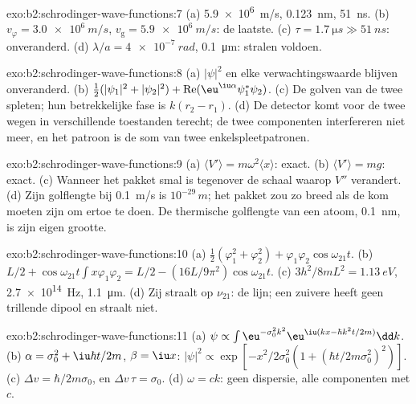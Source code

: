 \begin{solution}{exo:b2:schrodinger-wave-functions:7}
(a) \qty{5.9e6}{m/s}, \qty{0.123}{nm}, \qty{51}{ns}. (b)
$v_\varphi = \qty{3.0e6}{m/s}$,
$v_{\text{g}} = \qty{5.9e6}{m/s}$: de laatste. (c)
$\tau = \qty{1.7}{\micro s} \gg
\qty{51}{ns}$: onveranderd. (d)
$\lambda/a = \qty{4e-7}{rad}$, \qty{0.1}{\micro m}:
stralen voldoen.
\end{solution}

\begin{solution}{exo:b2:schrodinger-wave-functions:8}
(a) $|\psi|^2$ en elke verwachtingswaarde blijven onveranderd. (b)
$\tfrac12(|\psi_1|^2
+ |\psi_2|^2) + \operatorname{Re}(\eu^{\iu\alpha}\psi_1^*\psi_2)$.
(c) De golven van
de twee spleten; hun betrekkelijke fase is $k(r_2 - r_1)$. (d) De detector
komt voor de twee wegen in verschillende toestanden terecht; de twee componenten
interfereren niet meer, en het patroon is de som van twee enkelspleet\-patronen.
\end{solution}

\begin{solution}{exo:b2:schrodinger-wave-functions:9}
(a) $\langle V'\rangle = m\omega^2\langle x\rangle$: exact. (b)
$\langle V'\rangle
= mg$: exact. (c) Wanneer het pakket smal is tegenover de
schaal waarop
$V''$ verandert. (d) Zijn golflengte bij \qty{0.1}{m/s} is $10^{-29}\,\unit{m}$; het
pakket zou zo breed als de kom moeten zijn om ertoe te doen. De thermische
golflengte van een atoom, \qty{0.1}{nm}, is zijn eigen grootte.
\end{solution}

\begin{solution}{exo:b2:schrodinger-wave-functions:10}
(a)
$\tfrac12(\varphi_1^2 + \varphi_2^2) + \varphi_1\varphi_2\cos\omega_{21}t$.
(b)
$L/2 +
\cos\omega_{21}t\int x\varphi_1\varphi_2 = L/2 - (16L/9\pi^2)\cos\omega_{21}t$.
(c)
$3h^2/8mL^2 = \qty{1.13}{eV}$, \qty{2.7e14}{Hz}, \qty{1.1}{\micro m}. (d)
Zij straalt
op $\nu_{21}$: de lijn; een zuivere  heeft geen trillende
dipool en straalt niet.
\end{solution}

\begin{solution}{exo:b2:schrodinger-wave-functions:11}
(a)
$\psi \propto \int\eu^{-\sigma_0^2k^2}\eu^{\iu(kx - \hbar k^2t/2m)}\dd k$.
(b) $\alpha =
\sigma_0^2 + \iu\hbar t/2m$, $\beta = \iu x$:
$|\psi|^2 \propto \exp[-x^2/2\sigma_0^2(1 +
(\hbar t/2m\sigma_0^2)^2)]$. (c)
$\Delta v = \hbar/2m\sigma_0$, en $\Delta v\,\tau =
\sigma_0$. (d)
$\omega = ck$: geen dispersie, alle componenten met $c$.
\end{solution}


